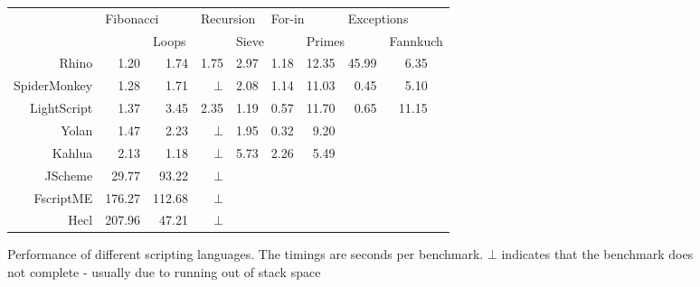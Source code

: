 \begin{figure}
\begin{center}
\begin{tabular}{|r|r|r|r|r|r|r|r|rr|}
\hline 
& \multicolumn{2}{|l|}{Fibonacci} & \multicolumn{2}{|l|}{Recursion} & \multicolumn{2}{|l|}{For-in} & \multicolumn{2}{|l}{Exceptions} & \\
& & \multicolumn{2}{|l|}{Loops} & \multicolumn{2}{|l|}{Sieve} & \multicolumn{2}{|l|}{Primes} & \multicolumn{2}{|l|}{Fannkuch} \\
\hline 
Rhino       & 1.20 & 1.74 & 1.75   & 2.97 & 1.18 & 12.35 & 45.99 & 6.35 & \\ 
\hline 
SpiderMonkey& 1.28 & 1.71 & $\bot$ & 2.08 & 1.14 & 11.03 & 0.45  & 5.10 & \\ 
\hline 
LightScript & 1.37 & 3.45 & 2.35   & 1.19 & 0.57 & 11.70 & 0.65  & 11.15 & \\
\hline 
Yolan       & 1.47 & 2.23 & $\bot$ & 1.95 & 0.32 &  9.20 &  &  & \\
\hline 
Kahlua      & 2.13 & 1.18 & $\bot$ &  5.73 & 2.26 & 5.49 &  &  & \\ 
\hline 
JScheme    & 29.77 & 93.22 & $\bot$ & & & & & & \\ 
\hline 
FscriptME & 176.27 & 112.68& $\bot$ & & & & & & \\ 
\hline 
Hecl      & 207.96 & 47.21 & $\bot$ & & & & & & \\ 
\hline 
\end{tabular}
\caption{Performance of different scripting languages. The timings are seconds per benchmark. $\bot$ indicates that the benchmark does not complete - usually due to running out of stack space}
\end{center}
\end{figure}
